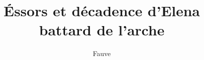 %
%
%
%



\title{Éssors et décadence d’Elena battard de l’arche}
\author{Fauve}
\date{}


\makeatletter
\makeatother
